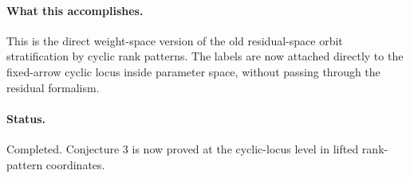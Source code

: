 \paragraph{What this accomplishes.}
This is the direct weight-space version of the old residual-space orbit
stratification by cyclic rank patterns. The labels are now attached directly to
the fixed-arrow cyclic locus inside parameter space, without passing through the
residual formalism.

\paragraph{Status.}
Completed. Conjecture 3 is now proved at the cyclic-locus level in lifted
rank-pattern coordinates.
